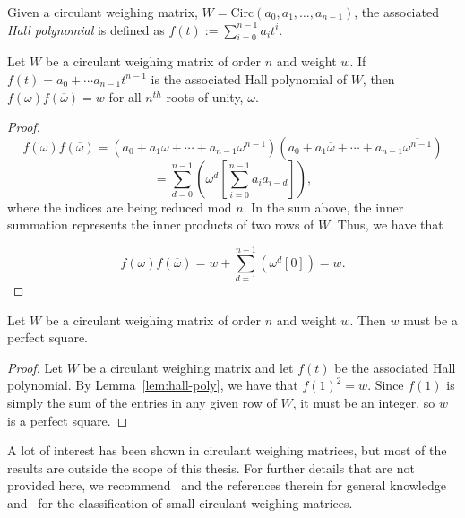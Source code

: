 \begin{definition} \label{def:hall-poly}
 Given a circulant weighing matrix, $W = \text{Circ}(a_0,a_1,\dots,a_{n-1})$, the associated {\it Hall polynomial} is defined as $f(t) := \displaystyle\sum_{i=0}^{n-1}a_it^i$.
\end{definition}

\begin{lemma} \label{lem:hall-poly}
 Let $W$ be a circulant weighing matrix of order $n$ and weight $w$. If $f(t) = a_0 + \cdots a_{n-1}t^{n-1}$ is the associated Hall polynomial of $W$, then $f(\omega)f(\overline{\omega}) = w$ for all $n^{th}$ roots of unity, $\omega$.
 
 \begin{proof}
  $$f(\omega)f(\overline{\omega}) = (a_0 + a_1\omega + \cdots + a_{n-1}\omega^{n-1})(a_0 + a_1\overline{\omega} + \cdots + a_{n-1}\overline{\omega^{n-1}})$$
  $$=\sum_{d=0}^{n-1} \left(\omega^d \left[\sum_{i=0}^{n-1} a_ia_{i-d}\right]\right),$$ where the indices are being reduced mod $n$. In the sum above, the inner summation represents the inner products of two rows of $W$. Thus, we have that
  
  $$f(\omega)f(\overline{\omega})=w + \sum_{d=1}^{n-1}\left( \omega^d \left[0\right]\right) = w.$$
  
 \end{proof}

\end{lemma}

\begin{theorem} \label{th:circ-perf-sqr}
 Let $W$ be a circulant weighing matrix of order $n$ and weight $w$. Then $w$ must be a perfect square.

 \begin{proof}
  Let $W$ be a circulant weighing matrix and let $f(t)$ be the associated Hall polynomial. By Lemma~\ref{lem:hall-poly}, we have that $f(1)^2 = w$. Since $f(1)$ is simply the sum of the entries in any given row of $W$, it must be an integer, so $w$ is a perfect square.
 \end{proof}

\end{theorem}


A lot of interest has been shown in circulant weighing matrices, but most of the results are outside the scope of this thesis. For further details that are not provided here, we recommend~\cite{SchmidtSmith} and the references therein for general knowledge and~\cite {circ-weigh-9,circ-weigh-10,strassler-thesis,circ-prime} for the classification of small circulant weighing matrices.

